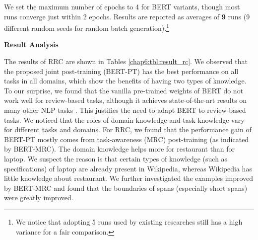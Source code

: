 We set the maximum number of epochs to 4 for BERT variants, though most runs converge just within 2 epochs.
Results are reported as averages of \textbf{9} runs (9 different random seeds for random batch generation).\footnote{We notice that adopting 5 runs used by existing researches still has a high variance for a fair comparison.} 

\textbf{Result Analysis}\\

\begin{table}[H]
    \centering
    \caption{RRC in EM (Exact Match) and F1.}
\label{chap6:tbl:result_rc}
\vspace{-3mm}
\end{table}


The results of RRC are shown in Tables \ref{chap6:tbl:result_rc}. 
We observed that the proposed joint post-training (BERT-PT) has the best performance on all tasks in all domains, which show the benefits of having two types of knowledge.
To our surprise, we found that the vanilla pre-trained weights of BERT do not work well for review-based tasks, although it achieves state-of-the-art results on many other NLP tasks \cite{devlin2018bert}.
This justifies the need to adapt BERT to review-based tasks.
We noticed that the roles of domain knowledge and task knowledge vary for different tasks and domains.
For RRC, we found that the performance gain of BERT-PT mostly comes from task-awareness (MRC) post-training (as indicated by BERT-MRC).
The domain knowledge helps more for restaurant than for laptop.
We suspect the reason is that certain types of knowledge (such as specifications) of laptop are already present in Wikipedia, whereas Wikipedia has little knowledge about restaurant.
We further investigated the examples improved by BERT-MRC and found that the boundaries of spans (especially short spans) were greatly improved. 

